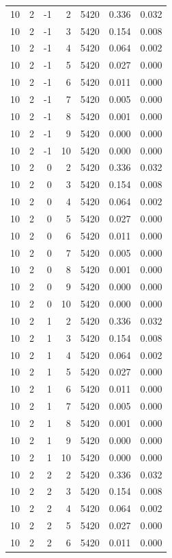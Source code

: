 \begin{table}
\begin{tabular}{rrrrrrr}
10 & 2 & -1 & 2 & 5420 & 0.336 & 0.032 \\
10 & 2 & -1 & 3 & 5420 & 0.154 & 0.008 \\
10 & 2 & -1 & 4 & 5420 & 0.064 & 0.002 \\
10 & 2 & -1 & 5 & 5420 & 0.027 & 0.000 \\
10 & 2 & -1 & 6 & 5420 & 0.011 & 0.000 \\
10 & 2 & -1 & 7 & 5420 & 0.005 & 0.000 \\
10 & 2 & -1 & 8 & 5420 & 0.001 & 0.000 \\
10 & 2 & -1 & 9 & 5420 & 0.000 & 0.000 \\
10 & 2 & -1 & 10 & 5420 & 0.000 & 0.000 \\
10 & 2 & 0 & 2 & 5420 & 0.336 & 0.032 \\
10 & 2 & 0 & 3 & 5420 & 0.154 & 0.008 \\
10 & 2 & 0 & 4 & 5420 & 0.064 & 0.002 \\
10 & 2 & 0 & 5 & 5420 & 0.027 & 0.000 \\
10 & 2 & 0 & 6 & 5420 & 0.011 & 0.000 \\
10 & 2 & 0 & 7 & 5420 & 0.005 & 0.000 \\
10 & 2 & 0 & 8 & 5420 & 0.001 & 0.000 \\
10 & 2 & 0 & 9 & 5420 & 0.000 & 0.000 \\
10 & 2 & 0 & 10 & 5420 & 0.000 & 0.000 \\
10 & 2 & 1 & 2 & 5420 & 0.336 & 0.032 \\
10 & 2 & 1 & 3 & 5420 & 0.154 & 0.008 \\
10 & 2 & 1 & 4 & 5420 & 0.064 & 0.002 \\
10 & 2 & 1 & 5 & 5420 & 0.027 & 0.000 \\
10 & 2 & 1 & 6 & 5420 & 0.011 & 0.000 \\
10 & 2 & 1 & 7 & 5420 & 0.005 & 0.000 \\
10 & 2 & 1 & 8 & 5420 & 0.001 & 0.000 \\
10 & 2 & 1 & 9 & 5420 & 0.000 & 0.000 \\
10 & 2 & 1 & 10 & 5420 & 0.000 & 0.000 \\
10 & 2 & 2 & 2 & 5420 & 0.336 & 0.032 \\
10 & 2 & 2 & 3 & 5420 & 0.154 & 0.008 \\
10 & 2 & 2 & 4 & 5420 & 0.064 & 0.002 \\
10 & 2 & 2 & 5 & 5420 & 0.027 & 0.000 \\
10 & 2 & 2 & 6 & 5420 & 0.011 & 0.000 \\

\end{tabular}
\end{table}

